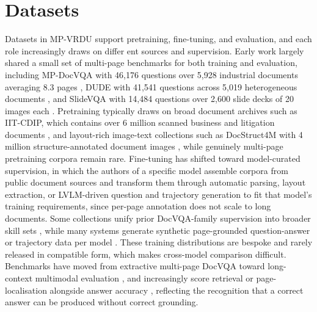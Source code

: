 \documentclass[11pt]{article}
\begin{document}
\section{Datasets}
Datasets in MP-VRDU support pretraining, fine-tuning, and evaluation, and each role increasingly draws on differ
ent sources and supervision. Early work largely shared a small set of multi-page benchmarks for both training and evaluation, including MP-DocVQA with 46,176 questions over 5,928 industrial documents averaging 8.3 pages \cite{tito2023hierarchical}, DUDE with 41,541 questions across 5,019 heterogeneous documents \cite{van2023document}, and SlideVQA with 14,484 questions over 2,600 slide decks of 20 images each \cite{tanaka2023slidevqa}. Pretraining typically draws on broad document archives such as IIT-CDIP, which contains over 6 million scanned business and litigation documents \cite{lewis2006building}, and layout-rich image-text collections such as DocStruct4M with 4 million structure-annotated document images \cite{hu2024mplug}, while genuinely multi-page pretraining corpora remain rare. Fine-tuning has shifted toward model-curated supervision, in which the authors of a specific model assemble corpora from public document sources and transform them through automatic parsing, layout extraction, or LVLM-driven question and trajectory generation to fit that model's training requirements, since per-page annotation does not scale to long documents. Some collections unify prior DocVQA-family supervision into broader skill sets \cite{tanaka2024instructdoc}, while many systems generate synthetic page-grounded question-answer or trajectory data per model \cite{jain2025simpledoc, xiong2026docr1, zhang2026docdancer}. These training distributions are bespoke and rarely released in compatible form, which makes cross-model comparison difficult. Benchmarks have moved from extractive multi-page DocVQA toward long-context multimodal evaluation \cite{ma2024mmlongbench, deng2025longdocurl}, and increasingly score retrieval or page-localisation alongside answer accuracy \cite{hui2024uda, xiong2026docr1, zhu2025doclens}, reflecting the recognition that a correct answer can be produced without correct grounding.
\end{document}
